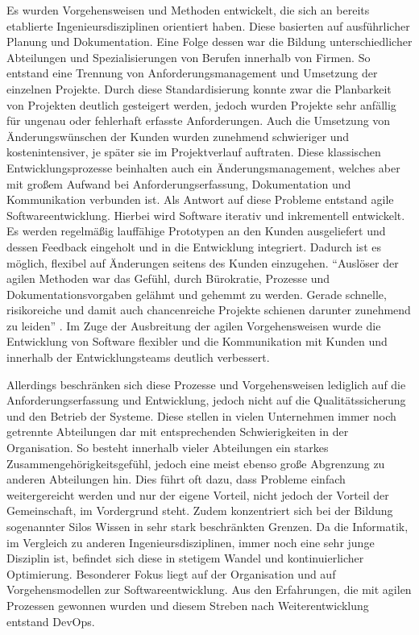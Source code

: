 Es wurden Vorgehensweisen und Methoden entwickelt, die sich an bereits etablierte Ingenieursdisziplinen orientiert haben. 
Diese basierten auf ausführlicher Planung und Dokumentation. Eine Folge dessen war die Bildung unterschiedlicher Abteilungen und Spezialisierungen von Berufen innerhalb von Firmen. 
So entstand eine Trennung von Anforderungsmanagement und Umsetzung der einzelnen Projekte. 
Durch diese Standardisierung konnte zwar die Planbarkeit von Projekten deutlich gesteigert werden, jedoch wurden Projekte sehr anfällig für ungenau oder fehlerhaft erfasste Anforderungen. 
Auch die Umsetzung von Änderungswünschen der Kunden wurden zunehmend schwieriger und kostenintensiver, je später sie im Projektverlauf auftraten. 
Diese klassischen Entwicklungsprozesse beinhalten auch ein Änderungsmanagement, welches aber mit großem Aufwand bei Anforderungserfassung, Dokumentation und Kommunikation verbunden ist.
Als Antwort auf diese Probleme entstand agile Softwareentwicklung. 
Hierbei wird Software iterativ und inkrementell entwickelt. 
Es werden regelmäßig lauffähige Prototypen an den Kunden ausgeliefert und dessen Feedback eingeholt und in die Entwicklung integriert. 
Dadurch ist es möglich, flexibel auf Änderungen seitens des Kunden einzugehen.
\enquote{Auslöser der agilen Methoden war das Gefühl, durch Bürokratie, Prozesse und Dokumentationsvorgaben gelähmt und gehemmt zu werden. Gerade schnelle, risikoreiche und damit auch chancenreiche Projekte schienen darunter zunehmend zu leiden} \parencite[][S. 183]{Schneider:2007}.
Im Zuge der Ausbreitung der agilen Vorgehensweisen wurde die Entwicklung von Software flexibler und die Kommunikation mit Kunden und innerhalb der Entwicklungsteams deutlich verbessert. 

Allerdings beschränken sich diese Prozesse und Vorgehensweisen lediglich auf die Anforderungserfassung und Entwicklung, jedoch nicht auf die Qualitätssicherung und den Betrieb der Systeme. 
Diese stellen in vielen Unternehmen immer noch getrennte Abteilungen dar mit entsprechenden Schwierigkeiten in der Organisation. 
So besteht innerhalb vieler Abteilungen ein starkes Zusammengehörigkeitsgefühl, jedoch eine meist ebenso große Abgrenzung zu anderen Abteilungen hin. 
Dies führt oft dazu, dass Probleme einfach weitergereicht werden und nur der eigene Vorteil, nicht jedoch der Vorteil der Gemeinschaft, im Vordergrund steht. 
Zudem konzentriert sich bei der Bildung sogenannter Silos Wissen in sehr stark beschränkten Grenzen. 
Da die Informatik, im Vergleich zu anderen Ingenieursdisziplinen, immer noch eine sehr junge Disziplin ist, befindet sich diese in stetigem Wandel und kontinuierlicher Optimierung. 
Besonderer Fokus liegt auf der Organisation und auf Vorgehensmodellen zur Softwareentwicklung. 
Aus den Erfahrungen, die mit agilen Prozessen gewonnen wurden und diesem Streben nach Weiterentwicklung entstand DevOps. \parencite[Vgl.][]{Debois:2008}

